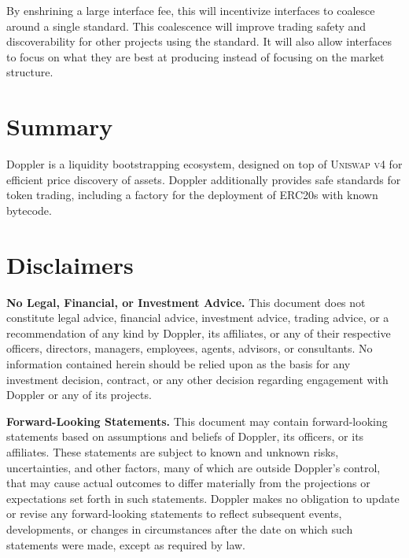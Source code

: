 \documentclass[sigconf,nonacm,prologue,table]{acmart}
\numberwithin{equation}{section}
\theoremstyle{definition}
\theoremstyle{remark}
\begin{document}
By enshrining a large interface fee, this will incentivize interfaces to coalesce around a single standard. This coalescence will improve trading safety and discoverability for other projects using the standard. It will also allow interfaces to focus on what they are best at producing instead of focusing on the market structure.

\section{Summary}

Doppler is a liquidity bootstrapping ecosystem, designed on top of \textsc{Uniswap v4} for efficient price discovery of assets. Doppler additionally provides safe standards for token trading, including a factory for the deployment of ERC20s with known bytecode.




\section{Disclaimers}

\textbf{No Legal, Financial, or Investment Advice.} This document does not constitute legal advice, financial advice, investment advice, trading advice, or a recommendation of any kind by Doppler, its affiliates, or any of their respective officers, directors, managers, employees, agents, advisors, or consultants. No information contained herein should be relied upon as the basis for any investment decision, contract, or any other decision regarding engagement with Doppler or any of its projects.

\textbf{Forward-Looking Statements.} This document may contain forward-looking statements based on assumptions and beliefs of Doppler, its officers, or its affiliates. These statements are subject to known and unknown risks, uncertainties, and other factors, many of which are outside Doppler's control, that may cause actual outcomes to differ materially from the projections or expectations set forth in such statements. Doppler makes no obligation to update or revise any forward-looking statements to reflect subsequent events, developments, or changes in circumstances after the date on which such statements were made, except as required by law.
\end{document}
